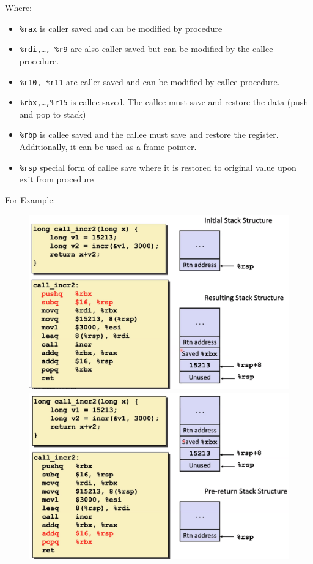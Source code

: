 \documentclass[12pt]{book}
\begin{document}
Where:
\begin{itemize}
        \item \texttt{\%rax} is caller saved and can be modified by procedure
        \item \texttt{\%rdi,\ldots, \%r9} are also caller saved but can be modified by the callee procedure.
        \item \texttt{\%r10, \%r11} are caller saved and can be modified by callee procedure.
        \item \texttt{\%rbx,\ldots,\%r15} is callee saved. The callee must save and restore the data (push and pop to
                stack)
        \item \texttt{\%rbp} is callee saved and the callee must save and restore the register. Additionally, 
                it can be used as a frame pointer.
        \item \texttt{\%rsp} special form of callee save where it is restored to original value upon exit from procedure
\end{itemize}
\pagebreak

For Example:
\begin{figure}[h]
        \centering
        \includegraphics[scale = 0.3]{./figures/saveEx1}
        \includegraphics[scale = 0.3]{./figures/saveEx2}
\end{figure}
\end{document}
